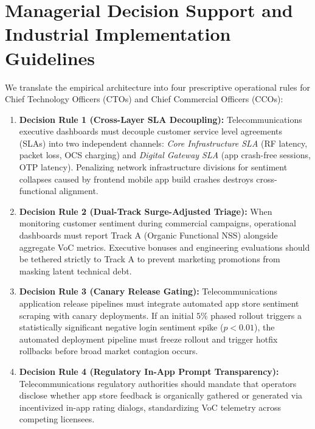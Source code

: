 \documentclass[5p,twocolumn,authoryear]{elsarticle}
\begin{document}
\section{Managerial Decision Support and Industrial Implementation Guidelines}
\label{sec:managerial_dss}

We translate the empirical architecture into four prescriptive operational rules for Chief Technology Officers (CTOs) and Chief Commercial Officers (CCOs):
\begin{enumerate}
    \item \textbf{Decision Rule 1 (Cross-Layer SLA Decoupling):} Telecommunications executive dashboards must decouple customer service level agreements (SLAs) into two independent channels: \textit{Core Infrastructure SLA} (RF latency, packet loss, OCS charging) and \textit{Digital Gateway SLA} (app crash-free sessions, OTP latency). Penalizing network infrastructure divisions for sentiment collapses caused by frontend mobile app build crashes destroys cross-functional alignment.
    \item \textbf{Decision Rule 2 (Dual-Track Surge-Adjusted Triage):} When monitoring customer sentiment during commercial campaigns, operational dashboards must report Track A (Organic Functional NSS) alongside aggregate VoC metrics. Executive bonuses and engineering evaluations should be tethered strictly to Track A to prevent marketing promotions from masking latent technical debt.
    \item \textbf{Decision Rule 3 (Canary Release Gating):} Telecommunications application release pipelines must integrate automated app store sentiment scraping with canary deployments. If an initial $5\%$ phased rollout triggers a statistically significant negative login sentiment spike ($p < 0.01$), the automated deployment pipeline must freeze rollout and trigger hotfix rollbacks before broad market contagion occurs.
    \item \textbf{Decision Rule 4 (Regulatory In-App Prompt Transparency):} Telecommunications regulatory authorities should mandate that operators disclose whether app store feedback is organically gathered or generated via incentivized in-app rating dialogs, standardizing VoC telemetry across competing licensees.
\end{enumerate}
\end{document}
